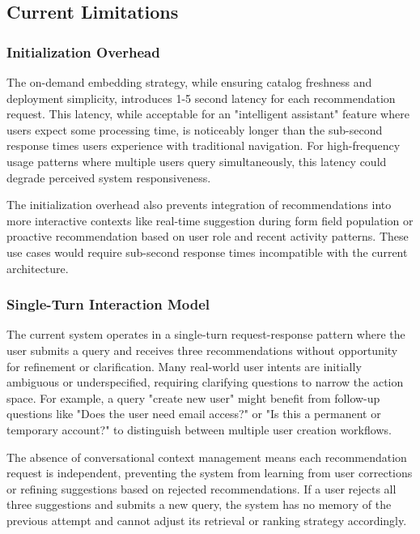 \subsection{Current Limitations}

\subsubsection{Initialization Overhead}

The on-demand embedding strategy, while ensuring catalog freshness and deployment simplicity, introduces 1-5 second latency for each recommendation request. This latency, while acceptable for an "intelligent assistant" feature where users expect some processing time, is noticeably longer than the sub-second response times users experience with traditional navigation. For high-frequency usage patterns where multiple users query simultaneously, this latency could degrade perceived system responsiveness.

The initialization overhead also prevents integration of recommendations into more interactive contexts like real-time suggestion during form field population or proactive recommendation based on user role and recent activity patterns. These use cases would require sub-second response times incompatible with the current architecture.

\subsubsection{Single-Turn Interaction Model}

The current system operates in a single-turn request-response pattern where the user submits a query and receives three recommendations without opportunity for refinement or clarification. Many real-world user intents are initially ambiguous or underspecified, requiring clarifying questions to narrow the action space. For example, a query "create new user" might benefit from follow-up questions like "Does the user need email access?" or "Is this a permanent or temporary account?" to distinguish between multiple user creation workflows.

The absence of conversational context management means each recommendation request is independent, preventing the system from learning from user corrections or refining suggestions based on rejected recommendations. If a user rejects all three suggestions and submits a new query, the system has no memory of the previous attempt and cannot adjust its retrieval or ranking strategy accordingly.

